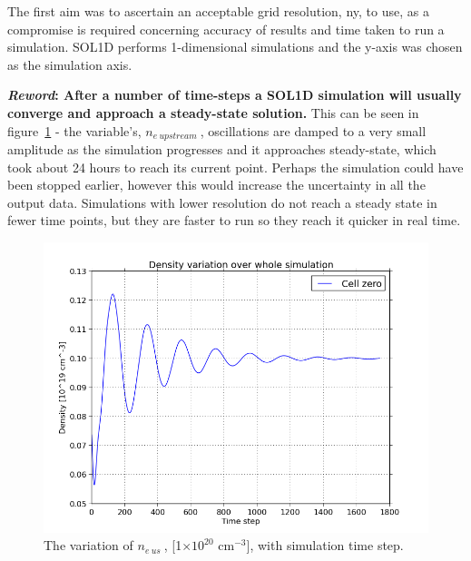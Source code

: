 \documentclass[12pt]{article}  %
\providecommand{\e}[1]{\ensuremath{\times 10^{#1}}} %
\providecommand{\pow}[1]{{$^{#1}$}} %
\providecommand{\neupstream}{$n_{e~upstream}~$} %
\providecommand{\neus}{$n_{e~us}~$} %
\begin{document}
The first aim was to ascertain an acceptable grid resolution, ny, to use, as a compromise is required concerning accuracy of results and time taken to run a simulation. SOL1D performs 1-dimensional simulations and the y-axis was chosen as the simulation axis. 

\textbf{\textit{Reword}: After a number of time-steps a SOL1D simulation will usually converge and approach a steady-state solution.} This can be seen in figure~\ref{figne_var_ny=800} - the variable's, \neupstream, oscillations are damped to a very small amplitude as the simulation progresses and it approaches steady-state, which took about 24 hours to reach its current point. Perhaps the simulation could have been stopped earlier, however this would increase the uncertainty in all the output data. Simulations with lower resolution do not reach a steady state in fewer time points, but they are faster to run so they reach it quicker in real time.

\begin{figure}
	\includegraphics[scale=0.4]{Figures/sol1d/ne_var_ny=800.png}
	\centering
	\caption{The variation of \neus, [1\e{20} cm\pow{-3}], with simulation time step. }\label{figne_var_ny=800}
\end{figure}
\end{document}
